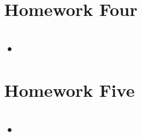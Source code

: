 \documentclass[colorlinks,11pt,a4paper,normalphoto,withhyper,ragged2e]{altareport}
\begin{document}
	\pagebreak
	
	
	
	
	
%
%    
%    
%    
%    
	
	
	
	\pagebreak
	
	
	
\section{Homework Four}
	
	\subsection{•}
	
	
	\pagebreak
	
	
	
	
\section{Homework Five}
	
	\subsection{•}
	
\end{document}
